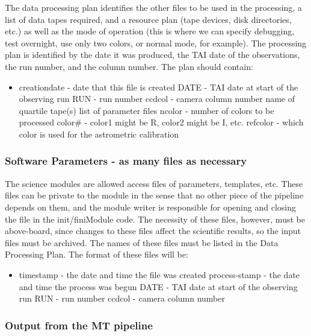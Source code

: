 	The data processing plan identifies the other files to be used in
the processing, a list of data tapes required, and a resource plan (tape
devices, disk directories, etc.) as well as the mode of operation (this is
where we can specify debugging, test overnight, use only two colors, or
normal mode, for example).  The processing plan is identified by the date
it was produced, the TAI date of the observations, the run number, and the 
column number.
The plan should contain:
\begin{itemize}
\item creationdate - date that this file is created
\sitem DATE - TAI date at start of the observing run
\sitem RUN - run number
\sitem ccdcol - camera column number
\sitem name of quartile tape(s)
\sitem list of parameter files
\sitem ncolor - number of colors to be processed
\sitem color\# - color1 might be R, color2 might be I, etc.
\sitem refcolor - which color is used for the astrometric calibration
\end{itemize}

\subsubsection{Software Parameters - as many files as necessary}

The science modules are allowed access files of parameters, templates, etc.
These files can be private to the module in the sense that no other piece
of the pipeline depends on them, and the module writer is responsible for
opening and closing the file in the init/finiModule code.  The necessity
of these files, however, must be above-board, since changes to these files
affect the scientific results, so the input files must be archived.  The
names of these files must be listed in the Data Processing Plan.  The format
of these files will be:

\begin{itemize}
\item timestamp - the date and time the file was created
\sitem process-stamp - the date and time the process was begun
\sitem DATE - TAI date at start of the observing run
\sitem RUN - run number
\sitem ccdcol - camera column number
\end{itemize}

\subsubsection{Output from the MT pipeline}

